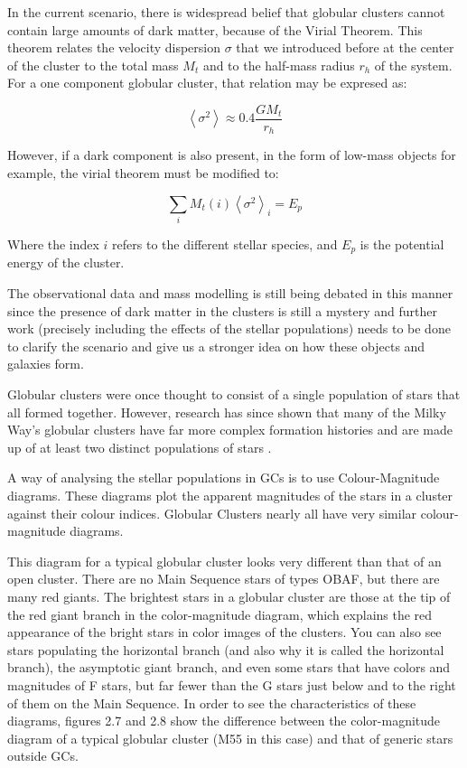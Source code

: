 In the current scenario, there is  widespread belief that globular clusters cannot contain large amounts of dark matter, because of the Virial Theorem. This theorem relates the velocity dispersion $ \sigma $ that we introduced before at the center of the cluster to the total mass $M_{t}$ and to the half-mass radius $r_{h}$ of the system. For a one component globular cluster, that relation may be expresed as:

\begin{equation}
\left\langle \sigma^{2}\right\rangle \approx0.4\frac{GM_{t}}{r_{h}}
\end{equation}

However, if a dark component is also present, in the form of low-mass objects for example, the virial theorem must be modified to:

\begin{equation}
\sum_{i}M_{t}(i)\left\langle \sigma^{2}\right\rangle _{i}=E_{p}
\end{equation}

Where the index $i$ refers to the different stellar species, and $E_{p}$ is the potential energy of the cluster.

The observational data and mass modelling is still being debated in this manner since the presence of dark matter in the clusters is still a mystery and further work (precisely including the effects of the stellar populations) needs to be done to clarify the scenario and give us a stronger idea on how these objects and galaxies form. 


Globular clusters were once thought to consist of a single population of stars that all formed together. However, research has since shown that many of the Milky Way's globular clusters have far more complex formation histories and are made up of at least two distinct populations of stars \cite{15}.

A way of analysing the stellar populations in GCs is to use Colour-Magnitude diagrams. These diagrams plot the apparent magnitudes of the stars in a cluster against their colour indices. Globular Clusters nearly all have very similar colour-magnitude diagrams.

This diagram for a typical globular cluster looks very different than that of an open cluster. There are no Main Sequence stars of types OBAF, but there are many red giants. The brightest stars in a globular cluster are those at the tip of the red giant branch in the color-magnitude diagram, which explains the red appearance of the bright stars in color images of the clusters. You can also see stars populating the horizontal branch (and also why it is called the horizontal branch), the asymptotic giant branch, and even some stars that have colors and magnitudes of F stars, but far fewer than the G stars just below and to the right of them on the Main Sequence. In order to see the characteristics of these diagrams, figures 2.7 and 2.8 show the difference between the color-magnitude diagram of a typical globular cluster (M55 in this case) and that of generic stars outside GCs.

